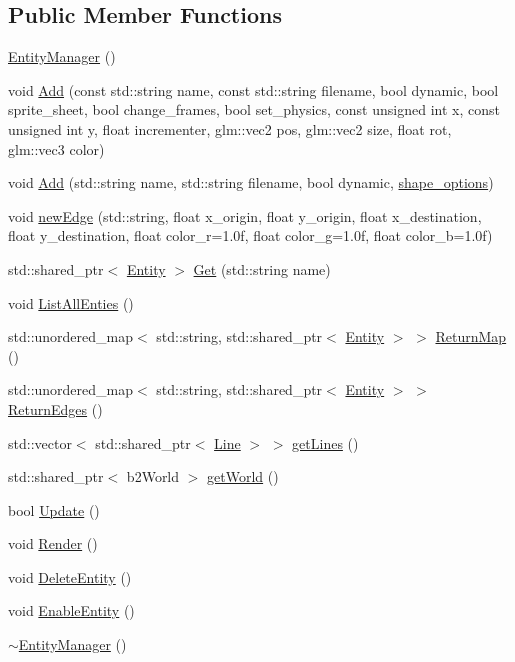 \subsection*{Public Member Functions}
\begin{DoxyCompactItemize}
\item 
\hyperlink{classEntityManager_a7555637657d090171be6ceee8451de0a}{Entity\+Manager} ()
\item 
void \hyperlink{classEntityManager_a8724955e17641352db006a0050205d6d}{Add} (const std\+::string name, const std\+::string filename, bool dynamic, bool sprite\+\_\+sheet, bool change\+\_\+frames, bool set\+\_\+physics, const unsigned int x, const unsigned int y, float incrementer, glm\+::vec2 pos, glm\+::vec2 size, float rot, glm\+::vec3 color)
\item 
void \hyperlink{classEntityManager_a4d99f8a7949e50136c4665c2c53b31b3}{Add} (std\+::string name, std\+::string filename, bool dynamic, \hyperlink{entity__manager_8h_ad272ece963b9cc856176573f48fc6554}{shape\+\_\+options})
\item 
void \hyperlink{classEntityManager_a086131de1baa9936e0ffc6830bbe5039}{new\+Edge} (std\+::string, float x\+\_\+origin, float y\+\_\+origin, float x\+\_\+destination, float y\+\_\+destination, float color\+\_\+r=1.\+0f, float color\+\_\+g=1.\+0f, float color\+\_\+b=1.\+0f)
\item 
std\+::shared\+\_\+ptr$<$ \hyperlink{classEntity}{Entity} $>$ \hyperlink{classEntityManager_a8ece29270f575248ad03fad82f10b30b}{Get} (std\+::string name)
\item 
void \hyperlink{classEntityManager_ad16c34fbdcb0da9e9a3e1c59887d6e52}{List\+All\+Enties} ()
\item 
std\+::unordered\+\_\+map$<$ std\+::string, std\+::shared\+\_\+ptr$<$ \hyperlink{classEntity}{Entity} $>$ $>$ \hyperlink{classEntityManager_af1f233c05d50ee11a0c21cff1361e136}{Return\+Map} ()
\item 
std\+::unordered\+\_\+map$<$ std\+::string, std\+::shared\+\_\+ptr$<$ \hyperlink{classEntity}{Entity} $>$ $>$ \hyperlink{classEntityManager_a1b2f7559ef13126beebc8d0f5c32234c}{Return\+Edges} ()
\item 
std\+::vector$<$ std\+::shared\+\_\+ptr$<$ \hyperlink{classLine}{Line} $>$ $>$ \hyperlink{classEntityManager_a049eb8f4a36e91fe1b85d3fc8c7ef4e7}{get\+Lines} ()
\item 
std\+::shared\+\_\+ptr$<$ b2\+World $>$ \hyperlink{classEntityManager_ae684073af9ce6ab6e59cc9974c5f8a4c}{get\+World} ()
\item 
bool \hyperlink{classEntityManager_a1773a29978a78fc883eee2a037fab5bc}{Update} ()
\item 
void \hyperlink{classEntityManager_ad8bac9ea131d6b9dae9311dbc701d9ab}{Render} ()
\item 
void \hyperlink{classEntityManager_a9164014cb9331406a659d5ec61560f9d}{Delete\+Entity} ()
\item 
void \hyperlink{classEntityManager_a53286b6a783436258be418ec354dc584}{Enable\+Entity} ()
\item 
\hyperlink{classEntityManager_a71a36c9fb8d579a1a1ec108e0fccf175}{$\sim$\+Entity\+Manager} ()
\end{DoxyCompactItemize}

